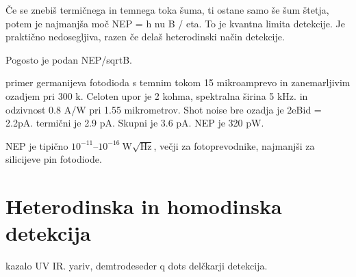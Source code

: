 Če se znebiš termičnega in temnega toka šuma, ti ostane samo še šum štetja, potem 
je najmanjša moč 
 NEP = h nu B / eta. To je kvantna limita detekcije. Je praktično nedosegljiva,
 razen če delaš heterodinski način detekcije. 


Pogosto je podan NEP/sqrtB. 

primer germanijeva fotodioda s temnim tokom 15 mikroamprevo in zanemarljivim ozadjem
 pri 300 k. Celoten upor je 2 kohma, spektralna širina 5 kHz. in odzivnost 0.8 A/W pri 1.55 mikrometrov.
 Shot noise bre ozadja je 2eBid = 2.2pA. termični je 2.9 pA. Skupni je 3.6 pA. 
 NEP je 320 pW. 
 
NEP je tipično $10^{-11}$--$10^{-16}~\si{\watt}\sqrt{\si{\hertz}}$, večji za fotoprevodnike, najmanjši
za silicijeve pin fotodiode. 


\section{Heterodinska in homodinska detekcija}

 kazalo UV IR.
 yariv, demtrodeseder
 q dots
 delčkarji detekcija.
